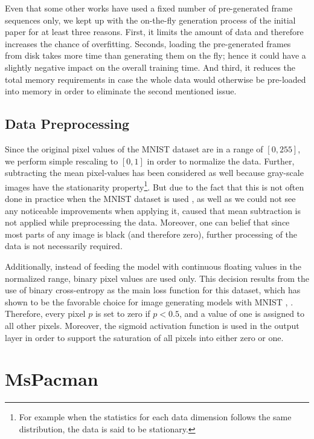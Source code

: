 Even that some other works have used a fixed number of pre-generated frame sequences only, we kept up with the on-the-fly generation process of the initial paper for at least three reasons. First, it limits the amount of data and therefore increases the chance of overfitting. Seconds, loading the pre-generated frames from disk takes more time than generating them on the fly; hence it could have a slightly negative impact on the overall training time. And third, it reduces the total memory requirements in case the whole data would otherwise be pre-loaded into memory in order to eliminate the second mentioned issue.

\subsection{Data Preprocessing}

Since the original pixel values of the MNIST dataset are in a range of $[0, 255]$, we perform simple rescaling to $[0, 1]$ in order to normalize the data. Further, subtracting the mean pixel-values has been considered as well because gray-scale images have the stationarity property\footnote{For example when the statistics for each data dimension follows the same distribution, the data is said to be stationary.}. But due to the fact that this is not often done in practice when the MNIST dataset is used \parencite{stanford_data_pre}, as well as we could not see any noticeable improvements when applying it, caused that mean subtraction is not applied while preprocessing the data. Moreover, one can belief that since most parts of any image is black (and therefore zero), further processing of the data is not necessarily required.

Additionally, instead of feeding the model with continuous floating values in the normalized range, binary pixel values are used only. This decision results from the use of binary cross-entropy as the main loss function for this dataset, which has shown to be the favorable choice for image generating models with MNIST \parencite{unsup_learn_lstm}, \parencite{conv_lstm_nowcasting}. Therefore, every pixel $p$ is set to zero if $p < \num{0.5} $, and a value of one is assigned to all other pixels. Moreover, the sigmoid activation function is used in the output layer in order to support the saturation of all pixels into either zero or one.

\section{MsPacman} \label{sec:ds_pac}

